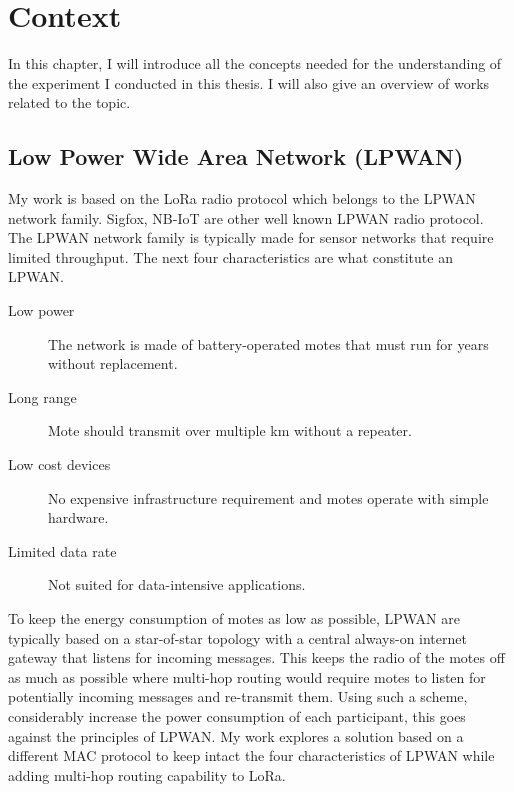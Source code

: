 \chapter{Context\label{section:context}}

In this chapter, I will introduce all the concepts needed for the understanding
of the experiment I conducted in this thesis.
I will also give an overview of works related to the topic.

\section{Low Power Wide Area Network (LPWAN)\label{section:lpwan}}

My work is based on the LoRa radio protocol which belongs to the LPWAN network
family.
Sigfox, NB-IoT are other well known LPWAN radio protocol.
The LPWAN network family is typically made for sensor networks that require
limited throughput.
The next four characteristics are what constitute an LPWAN.

\begin{description}
  \item[Low power] The network is made of battery-operated
    motes that must run for years without replacement.
  \item[Long range] Mote should transmit over multiple km without a repeater.
  \item[Low cost devices] No expensive infrastructure requirement and motes
    operate with simple hardware.
  \item[Limited data rate] Not suited for data-intensive applications.
\end{description}

To keep the energy consumption of motes as low as possible, LPWAN are typically
based on a star-of-star topology with a central always-on internet gateway that listens
for incoming messages.
This keeps the radio of the motes off as much as possible where multi-hop routing
would require motes to listen for potentially incoming messages and
re-transmit them.
Using such a scheme, considerably increase the power consumption of each
participant, this goes against the principles of LPWAN.
My work explores a solution based on a different MAC protocol to keep intact the
four characteristics of LPWAN while adding multi-hop routing capability to LoRa.

\paragraph{}


